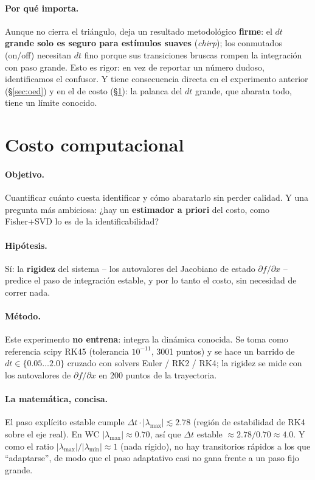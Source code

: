 \documentclass[11pt,a4paper]{article}
\begin{document}
\paragraph{Por qué importa.} Aunque no cierra el triángulo, deja un resultado metodológico \textbf{firme}: el \textbf{$dt$ grande solo es seguro para estímulos suaves} (\emph{chirp}); los conmutados (on/off) necesitan $dt$ fino porque sus transiciones bruscas rompen la integración con paso grande. Esto es rigor: en vez de reportar un número dudoso, identificamos el confusor. Y tiene consecuencia directa en el experimento anterior (§\ref{sec:oed}) y en el de costo (§\ref{sec:costo}): la palanca del $dt$ grande, que abarata todo, tiene un límite conocido.

\section{Costo computacional}
\label{sec:costo}

\paragraph{Objetivo.} Cuantificar cuánto cuesta identificar y cómo abaratarlo sin perder calidad. Y una pregunta más ambiciosa: ¿hay un \textbf{estimador a priori} del costo, como Fisher+SVD lo es de la identificabilidad?

\paragraph{Hipótesis.} Sí: la \textbf{rigidez} del sistema \--- los autovalores del Jacobiano de estado $\partial f/\partial x$ \--- predice el paso de integración estable, y por lo tanto el costo, sin necesidad de correr nada.

\paragraph{Método.} Este experimento \textbf{no entrena}: integra la dinámica conocida. Se toma como referencia scipy RK45 (tolerancia $10^{-11}$, 3001 puntos) y se hace un barrido de $dt\in\{0.05\dots2.0\}$ cruzado con solvers Euler / RK2 / RK4; la rigidez se mide con los autovalores de $\partial f/\partial x$ en 200 puntos de la trayectoria.

\paragraph{La matemática, concisa.} El paso explícito estable cumple $\Delta t\cdot|\lambda_{\max}|\lesssim 2.78$ (región de estabilidad de RK4 sobre el eje real). En WC $|\lambda_{\max}|\approx0.70$, así que $\Delta t$ estable $\approx 2.78/0.70\approx4.0$. Y como el ratio $|\lambda_{\max}|/|\lambda_{\min}|\approx1$ (nada rígido), no hay transitorios rápidos a los que ``adaptarse'', de modo que el paso adaptativo casi no gana frente a un paso fijo grande.
\end{document}
